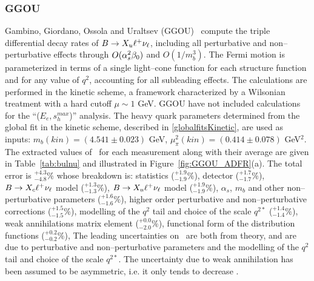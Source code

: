 \subsubsection{GGOU}
Gambino, Giordano, Ossola and Uraltsev (GGOU)~\cite{Gambino:2007rp} 
compute the triple differential decay rates of $B \to X_u \ell^+ \nu_\ell$, 
including all perturbative and non--perturbative effects through $O(\alpha_s^2 \beta_0)$ 
and $O(1/m_b^3)$. 
The Fermi motion is parameterized in terms of a single light--cone function 
for each structure function and for any value of $q^2$, accounting for all subleading effects. 
The calculations are performed in the kinetic scheme, a framework characterized by a Wilsonian 
treatment with a hard cutoff $\mu \sim 1 $ GeV.
GGOU have not included calculations for the ``($E_e,s^{max}_h$)'' analysis. 
The heavy quark parameters determined  
from the global fit in the kinetic scheme, described in \ref{globalfitsKinetic}, are used as inputs: 
$m_b(kin)=(4.541 \pm 0.023)$ GeV, 
$\mu_\pi^2(kin)=(0.414 \pm 0.078)$ GeV$^2$. 
The extracted values
of \vub\, for each measurement along with their average are given in
Table~\ref{tab:bulnu} and illustrated in Figure~\ref{fig:GGOU_ADFR}(a).
The total error is $^{+4.3}_{-4.8}\%$ whose breakdown is:
statistics ($^{+1.9}_{-1.9}\%$),
detector ($^{+1.7}_{-1.7}\%$),
$B\to X_c \ell^+ \nu_\ell$ model ($^{+1.3}_{-1.3}\%$),
$B\to X_u \ell^+ \nu_\ell$ model ($^{+1.9}_{-1.9}\%$),
$\alpha_s$, $m_b$ and other non--perturbative parameters ($^{+1.6}_{-1.6}\%$), 
higher order perturbative and non--perturbative corrections ($^{+1.5}_{-1.5}\%$), 
modelling of the $q^2$ tail and choice of the scale $q^{2*}$ ($^{+1.4}_{-1.4}\%$), 
weak annihilations matrix element ($^{+0.0}_{-2.0}\%$), 
functional form of the distribution functions ($^{+0.2}_{-0.2}\%$), 
The leading uncertainties
on  \vub\ are both from theory, and are due to perturbative and non--perturbative
parameters and the modelling of the $q^2$ tail and choice of the scale $q^{2*}$. 
The uncertainty due to 
weak annihilation has been assumed to be asymmetric, i.e. it only tends to decrease \vub.


